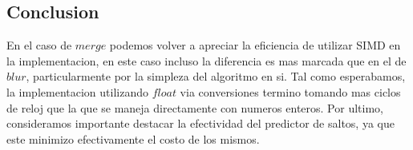 

\subsection{Conclusion}

En el caso de $merge$ podemos volver a apreciar la eficiencia de utilizar SIMD en la implementacion, en este caso incluso la diferencia es mas marcada que en el de $blur$, particularmente por la simpleza del algoritmo en si. Tal como esperabamos, la implementacion utilizando $float$ via conversiones termino tomando mas ciclos de reloj que la que se maneja directamente con numeros enteros. Por ultimo, consideramos importante destacar la efectividad del predictor de saltos, ya que este minimizo efectivamente el costo de los mismos.

